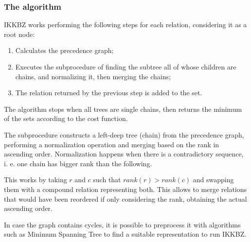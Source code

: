 \subsubsection{The algorithm}
IKKBZ works performing the following steps for each relation, considering it as a root node:
\begin{enumerate}
	\item Calculates the precedence graph;
	\item Executes the subprocedure of finding the subtree all of whose children are chains, and normalizing it, then merging the chains;
	\item The relation returned by the previous step is added to the set.
\end{enumerate}
The algorithm stops when all trees are single chains, then returns the minimum of the sets according to the cost function.

The subprocedure constructs a left-deep tree (chain) from the precedence graph, performing a normalization operation and merging based on the rank in ascending order. Normalization happens when there is a contradictory sequence, i. e. one chain has bigger rank than the following.

This works by taking $r$ and $c$ such that $rank(r) > rank(c)$ and swapping them with a compound relation representing both. This allows to merge relations that would have been reordered if only considering the rank, obtaining the actual ascending order.

In case the graph contains cycles, it is possible to preprocess it with algorithms such as Minimum Spanning Tree to find a suitable representation to run IKKBZ.
